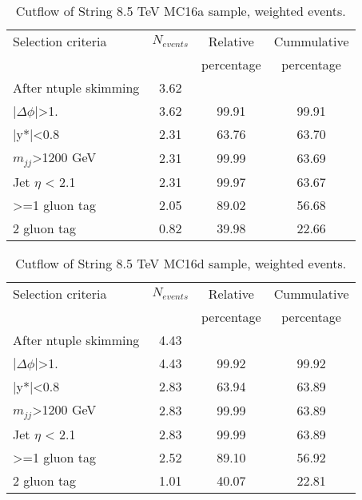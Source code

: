 \begin{table}[ht]
\begin{center}
\begin{tabular}{|l|c|c|c|}
\hline
Selection criteria & $N_{events}$ & Relative & Cummulative \\
 & & percentage & percentage \\
\hline
After ntuple skimming & 3.62 &  &  \\
$|\Delta\phi|$>1. & 3.62 & 99.91 & 99.91 \\
|y*|<0.8 & 2.31 & 63.76 & 63.70 \\
$m_{jj}$>1200 GeV & 2.31 & 99.99 & 63.69 \\
Jet $\eta$ < 2.1 & 2.31 & 99.97 & 63.67 \\
>=1 gluon tag & 2.05 & 89.02 & 56.68 \\
2 gluon tag & 0.82 & 39.98 & 22.66 \\
\hline
\end{tabular}
\end{center}
\caption{Cutflow of String 8.5 TeV MC16a sample, weighted events.}
\label{tab:String8p5MC16a}
\end{table}

\begin{table}[ht]
\begin{center}
\begin{tabular}{|l|c|c|c|}
\hline
Selection criteria & $N_{events}$ & Relative & Cummulative \\
 & & percentage & percentage \\
\hline
After ntuple skimming & 4.43 &  &  \\
$|\Delta\phi|$>1. & 4.43 & 99.92 & 99.92 \\
|y*|<0.8 & 2.83 & 63.94 & 63.89 \\
$m_{jj}$>1200 GeV & 2.83 & 99.99 & 63.89 \\
Jet $\eta$ < 2.1 & 2.83 & 99.99 & 63.89 \\
>=1 gluon tag & 2.52 & 89.10 & 56.92 \\
2 gluon tag & 1.01 & 40.07 & 22.81 \\
\hline
\end{tabular}
\end{center}
\caption{Cutflow of String 8.5 TeV MC16d sample, weighted events.}
\label{tab:String8p5MC16d}
\end{table}

